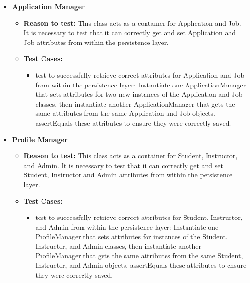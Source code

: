 \documentclass[12pt]{report}
\begin{document}
    	\begin{itemize}
    		\item \textbf{Application Manager}
    		\begin{itemize}
    			\item \textbf{Reason to test:} This class acts as a container for Application and Job. It is necessary to test that it can correctly get and set Application and Job attributes from within the persistence layer.
    			\item \textbf{Test Cases:} 
    			\begin{itemize}
    				\item test to successfully retrieve correct attributes for Application and Job from within the persistence layer: Instantiate one ApplicationManager that sets attributes for two new instances of the Application and Job classes, then instantiate another ApplicationManager that gets the same attributes from the same Application and Job objects. assertEquals these attributes to ensure they were correctly saved.
    			\end{itemize}
    			
    		\end{itemize}
    	\end{itemize}
    
    	\begin{itemize}
    		\item \textbf{Profile Manager}
    		\begin{itemize}
    			\item \textbf{Reason to test:} This class acts as a container for Student, Instructor, and Admin. It is necessary to test that it can correctly get and set Student, Instructor and Admin attributes from within the persistence layer.
    			\item \textbf{Test Cases:} 
    			\begin{itemize}
    				\item test to successfully retrieve correct attributes for Student, Instructor, and Admin from within the persistence layer: Instantiate one ProfileManager that sets attributes for instances of the Student, Instructor, and Admin classes, then instantiate another ProfileManager that gets the same attributes from the same Student, Instructor, and Admin objects. assertEquals these attributes to ensure they were correctly saved.
    			\end{itemize}
    			
    		\end{itemize}
    	\end{itemize}
    
\end{document}
